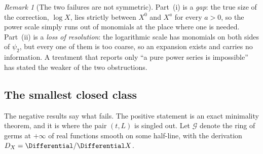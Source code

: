\documentclass[11pt,oneside]{article}
\theoremstyle{plain}
\theoremstyle{definition}
\theoremstyle{remark}
\newtheorem{remark}[theorem]{Remark}
\newcommand{\DX}{D_{X}}                                  %
\begin{document}
\begin{remark}[The two failures are not symmetric]
\label{plt:rmk:mot-asymmetry}
Part~(i) is a \emph{gap}: the true size of the correction, \(\log X\), lies
strictly between \(X^{0}\) and \(X^{a}\) for every \(a>0\), so the power scale
simply runs out of monomials at the place where one is needed.  Part~(ii) is a
\emph{loss of resolution}: the logarithmic scale has monomials on both sides of
\(\psi_{2}\), but every one of them is too coarse, so an expansion exists and
carries no information.  A treatment that reports only ``a pure power series is
impossible'' has stated the weaker of the two obstructions.
\end{remark}

\subsection{The smallest closed class}
\label{plt:sec:mot-smallest}

The negative results say what fails.  The positive statement is an exact
minimality theorem, and it is where the pair \((t,L)\) is singled out.  Let
\(\mathcal{G}\) denote the ring of germs at \(+\infty\) of real functions
smooth on some half-line, with the derivation
\(\DX=\Differential/\Differential X\).
\end{document}
